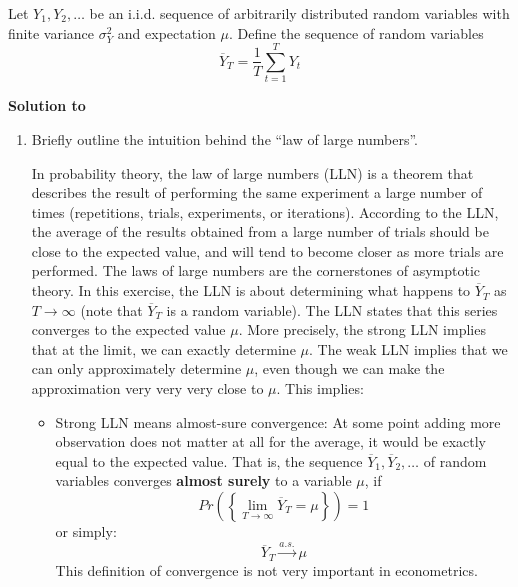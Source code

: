 Let $Y_{1},Y_{2},\ldots $ be an i.i.d. sequence of arbitrarily distributed random variables with finite variance $\sigma_Y ^{2}$ and expectation $\mu$. Define the sequence of
random variables
\begin{equation*}
    \overline{Y}_{T}=\frac{1}{T}\sum_{t=1}^{T}Y_{t}
\end{equation*}
\begin{solution}\textbf{Solution to }\end{solution}
\begin{enumerate}
    \item Briefly outline the intuition behind the \enquote{law of large numbers}.
          \begin{solution}
              In probability theory, the law of large numbers (LLN) is a theorem that describes the result of performing the same experiment a large number of times (repetitions, trials, experiments, or iterations). According to the LLN, the average of the results obtained from a large number of trials should be close to the expected value, and will tend to become closer as more trials are performed. The laws of large numbers are the cornerstones of asymptotic theory. In this exercise, the LLN is about determining what happens to $\overline{Y}_T$ as $T\rightarrow\infty$ (note that $\overline{Y}_T$ is a random variable). The LLN states that this series converges to the expected value $\mu$. More precisely, the strong LLN implies that at the limit, we can exactly determine $\mu$. The weak LLN implies that we can only approximately determine $\mu$, even though we can make the approximation very very very close to $\mu$. This implies:
              \begin{itemize}
                  \item Strong LLN means almost-sure convergence: At some point adding more observation does not matter at all for the average, it would be exactly equal to the expected value. That is, the sequence $\overline{Y}_{1},\overline{Y}_{2},\ldots $ of random variables converges \textbf{almost surely} to a variable $\mu$, if
                        \begin{equation*}
                            Pr\left( \left\{ \lim_{T\rightarrow \infty }\overline{Y}_{T}=\mu\right\} \right) =1
                        \end{equation*}
                        or simply:
                        \begin{equation*}
                            \overline{Y}_{T}\overset{a.s.}{\rightarrow }\mu
                        \end{equation*}
                        This definition of convergence is not very important in econometrics.


\end{itemize}
\end{solution}
\end{enumerate}
